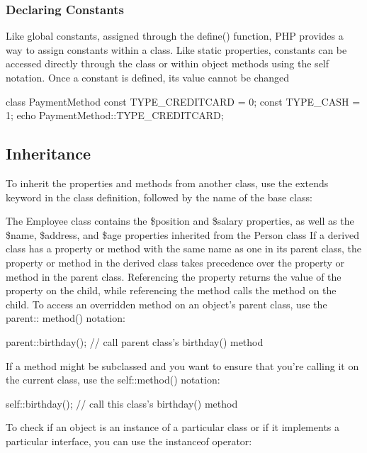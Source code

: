 \documentclass{report}
\begin{document}
\subsubsection{Declaring Constants}
\bigbreak \noindent 
Like global constants, assigned through the define() function, PHP provides a way to
assign constants within a class. Like static properties, constants can be accessed directly
through the class or within object methods using the self notation. Once a constant
is defined, its value cannot be changed
\bigbreak \noindent 
\begin{phpcode}
    class PaymentMethod
    {
        const TYPE_CREDITCARD = 0;
        const TYPE_CASH = 1;
    }
    echo PaymentMethod::TYPE_CREDITCARD;
\end{phpcode}


\bigbreak \noindent 
\subsection{Inheritance}
\bigbreak \noindent 
To inherit the properties and methods from another class, use the extends keyword in the class definition, followed by the name of the base class:
\bigbreak \noindent 
{}
\bigbreak \noindent 
The Employee class contains the \$position and \$salary properties, as well as the \$name,
\$address, and \$age properties inherited from the Person class
\bigbreak \noindent 
If a derived class has a property or method with the same name as one in its parent
class, the property or method in the derived class takes precedence over the property
or method in the parent class. Referencing the property returns the value of the property
on the child, while referencing the method calls the method on the child.
\bigbreak \noindent 
To access an overridden method on an object’s parent class, use the parent:: method() notation:
\bigbreak \noindent 
\begin{phpcode}
parent::birthday(); // call parent class's birthday() method
\end{phpcode}
\bigbreak \noindent 
If a method might be subclassed and you want to ensure that you’re calling it on the current class, use the self::method() notation:
\bigbreak \noindent 
\begin{phpcode}
self::birthday(); // call this class's birthday() method
\end{phpcode}
\bigbreak \noindent 
To check if an object is an instance of a particular class or if it implements a particular interface, you can use the instanceof operator:
\end{document}
